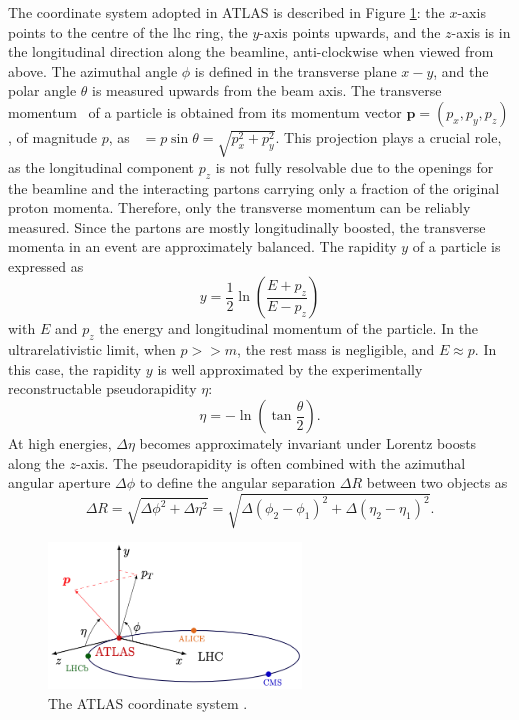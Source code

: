 \newpage
The coordinate system adopted in ATLAS is described in Figure \ref{fig-AtlasCoord}: the $x$-axis points to the centre of the \gls{lhc} ring, the $y$-axis points upwards, and the $z$-axis is in the longitudinal direction along the beamline, anti-clockwise when viewed from above. The azimuthal angle $\phi$ is defined in the transverse plane $x-y$, and the polar angle $\theta$ is measured upwards from the beam axis. The transverse momentum \pt\ of a particle is obtained from its momentum vector $\boldsymbol{p} = (p_x, p_y, p_z)$, of magnitude $p$, as \pt\ $= p \sin\theta = \sqrt{p_x^2 + p_y^2}$. This projection plays a crucial role, as the longitudinal component $p_z$ is not fully resolvable due to the openings for the beamline and the interacting partons carrying only a fraction of the original proton momenta. Therefore, only the transverse momentum can be reliably measured. Since the partons are mostly longitudinally boosted, the transverse momenta in an event are approximately balanced. The rapidity $y$ of a particle is expressed as 
\begin{equation}
  y = \frac{1}{2} \ln \left(\frac{E + p_z}{E - p_z}\right)
\end{equation}
with $E$ and $p_z$ the energy and longitudinal momentum of the particle. In the ultrarelativistic limit, when $p >> m$, the rest mass is negligible, and $E \approx p$. In this case, the rapidity $y$ is well approximated by the experimentally reconstructable pseudorapidity $\eta$:
\begin{equation}
  \eta = -\ln \left(\tan \frac{\theta}{2}\right).
\end{equation}
At high energies, $\Delta \eta$ becomes approximately invariant under Lorentz boosts along the $z$-axis. The pseudorapidity is often combined with the azimuthal angular aperture $\Delta \phi$ to define the angular separation $\Delta R$ between two objects as
\begin{equation}\label{eq-def-deltaR}
  \Delta R = \sqrt{\Delta \phi^2 + \Delta \eta^2} =  \sqrt{\Delta (\phi_2 - \phi_1)^2 + \Delta (\eta_2 - \eta_1)^2}.
\end{equation}

\begin{figure}[!h]
  \centering
  \includegraphics[width=0.6\textwidth]{Images/ATLAS/atlasCoor.png}
  \caption{The ATLAS coordinate system \cite{Strong:2020mge}.}
  \label{fig-AtlasCoord}
\end{figure}


